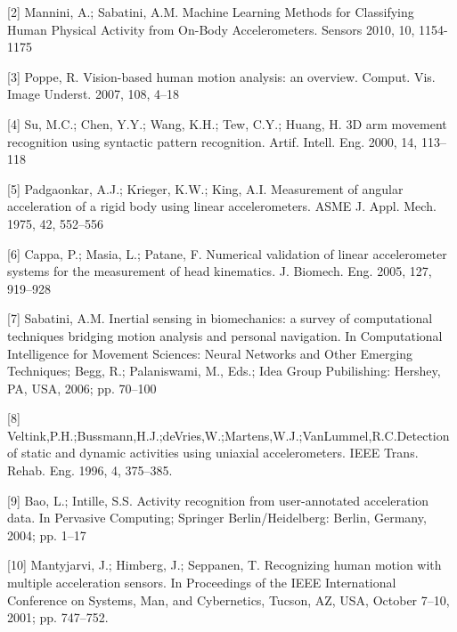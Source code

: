 \documentclass{article} %
\begin{document}
[2] Mannini, A.; Sabatini, A.M. Machine Learning Methods for Classifying Human Physical Activity from On-Body Accelerometers. Sensors 2010, 10, 1154-1175

[3] Poppe, R. Vision-based human motion analysis: an overview. Comput. Vis. Image Underst. 2007, 108, 4–18 

[4] Su, M.C.; Chen, Y.Y.; Wang, K.H.; Tew, C.Y.; Huang, H. 3D arm movement recognition using syntactic pattern recognition. Artif. Intell. Eng. 2000, 14, 113–118 

[5] Padgaonkar, A.J.; Krieger, K.W.; King, A.I. Measurement of angular acceleration of a rigid body using linear accelerometers. ASME J. Appl. Mech. 1975, 42, 552–556 

[6] Cappa, P.; Masia, L.; Patane, F. Numerical validation of linear accelerometer systems for the measurement of head kinematics. J. Biomech. Eng. 2005, 127, 919–928 

[7] Sabatini, A.M. Inertial sensing in biomechanics: a survey of computational techniques bridging motion analysis and personal navigation. In Computational Intelligence for Movement Sciences: Neural Networks and Other Emerging Techniques; Begg, R.; Palaniswami, M., Eds.; Idea Group Pubilishing: Hershey, PA, USA, 2006; pp. 70–100

[8] Veltink,P.H.;Bussmann,H.J.;deVries,W.;Martens,W.J.;VanLummel,R.C.Detection of static and dynamic activities using uniaxial accelerometers. IEEE Trans. Rehab. Eng. 1996, 4, 375–385. 

[9] Bao, L.; Intille, S.S. Activity recognition from user-annotated acceleration data. In Pervasive Computing; Springer Berlin/Heidelberg: Berlin, Germany, 2004; pp. 1–17 

[10] Mantyjarvi, J.; Himberg, J.; Seppanen, T. Recognizing human motion with multiple acceleration sensors. In Proceedings of the IEEE International Conference on Systems, Man, and Cybernetics, Tucson, AZ, USA, October 7–10, 2001; pp. 747–752.
\end{document}
